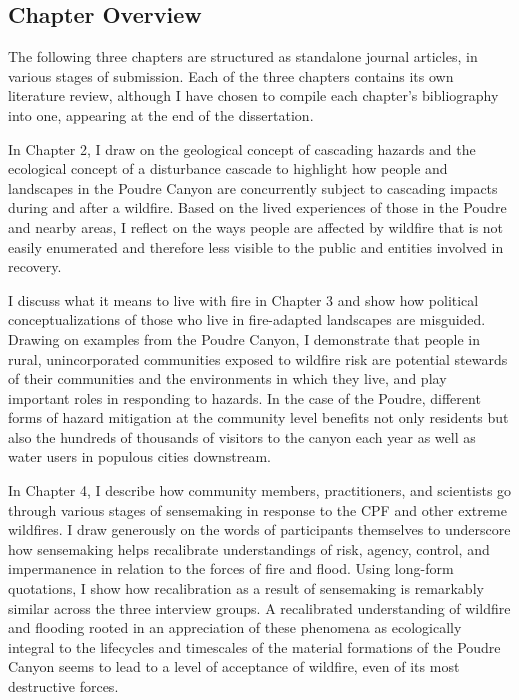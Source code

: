 \documentclass[
]{article}
\begin{document}
\subsection{Chapter Overview}\label{chapter-overview}

The following three chapters are structured as standalone journal articles, in various stages of submission. Each of the three chapters contains its own literature review, although I have chosen to compile each chapter's bibliography into one, appearing at the end of the dissertation.

In Chapter 2, I draw on the geological concept of cascading hazards and the ecological concept of a disturbance cascade to highlight how people and landscapes in the Poudre Canyon are concurrently subject to cascading impacts during and after a wildfire. Based on the lived experiences of those in the Poudre and nearby areas, I reflect on the ways people are affected by wildfire that is not easily enumerated and therefore less visible to the public and entities involved in recovery.

I discuss what it means to live with fire in Chapter 3 and show how political conceptualizations of those who live in fire-adapted landscapes are misguided. Drawing on examples from the Poudre Canyon, I demonstrate that people in rural, unincorporated communities exposed to wildfire risk are potential stewards of their communities and the environments in which they live, and play important roles in responding to hazards. In the case of the Poudre, different forms of hazard mitigation at the community level benefits not only residents but also the hundreds of thousands of visitors to the canyon each year as well as water users in populous cities downstream.

In Chapter 4, I describe how community members, practitioners, and scientists go through various stages of sensemaking in response to the CPF and other extreme wildfires. I draw generously on the words of participants themselves to underscore how sensemaking helps recalibrate understandings of risk, agency, control, and impermanence in relation to the forces of fire and flood. Using long-form quotations, I show how recalibration as a result of sensemaking is remarkably similar across the three interview groups. A recalibrated understanding of wildfire and flooding rooted in an appreciation of these phenomena as ecologically integral to the lifecycles and timescales of the material formations of the Poudre Canyon seems to lead to a level of acceptance of wildfire, even of its most destructive forces.
\end{document}
